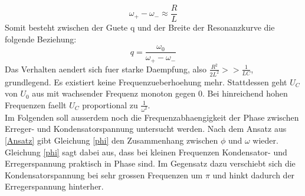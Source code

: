 \documentclass[titlepage=firstcover, captions=tableheading]{scrartcl}
\begin{document}
\begin{equation}
    \omega_+-\omega_-\approx \frac{R}{L}\nonumber
\end{equation}
Somit besteht zwischen der Guete q und der Breite der Resonanzkurve die folgende Beziehung:
\begin{equation}
    q=\frac{\omega_0}{\omega_+-\omega_-}\nonumber
\end{equation}
Das Verhalten aendert sich fuer starke Daempfung, also $\frac{R^2}{2L^2}>>\frac{1}{LC}$, grundlegend. Es existiert keine Frequenzueberhoehung mehr. Stattdessen geht $U_C$ von $U_0$ aus mit wachsender Frequenz monoton gegen 0. Bei hinreichend hohen Frequenzen faellt $U_C$ proportional zu $\frac{1}{\omega^2}$.\\
Im Folgenden soll ausserdem noch die Frequenzabhaengigkeit der Phase zwischen Erreger- und Kondensatorspannung untersucht werden. Nach dem Ansatz aus \ref{Ansatz} gibt Gleichung \ref{phi} den Zusammenhang zwischen $\phi$ und $\omega$ wieder. Gleichung \ref{phi} sagt dabei aus, dass bei kleinen Frequenzen Kondensator- und Erregerspannung praktisch in Phase sind. Im Gegensatz dazu verschiebt sich die Kondensatorspannung bei sehr grossen Frequenzen um $\pi$ und hinkt dadurch der Erregerspannung hinterher. 
\end{document}
